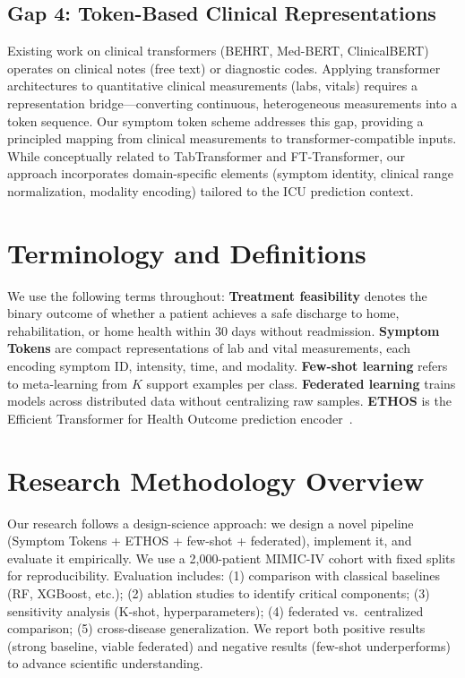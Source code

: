 \subsection{Gap 4: Token-Based Clinical Representations}

Existing work on clinical transformers (BEHRT, Med-BERT, ClinicalBERT) operates on clinical notes (free text) or diagnostic codes. Applying transformer architectures to quantitative clinical measurements (labs, vitals) requires a representation bridge---converting continuous, heterogeneous measurements into a token sequence. Our symptom token scheme addresses this gap, providing a principled mapping from clinical measurements to transformer-compatible inputs. While conceptually related to TabTransformer and FT-Transformer, our approach incorporates domain-specific elements (symptom identity, clinical range normalization, modality encoding) tailored to the ICU prediction context.

\section{Terminology and Definitions}

We use the following terms throughout: \textbf{Treatment feasibility} denotes the binary outcome of whether a patient achieves a safe discharge to home, rehabilitation, or home health within 30 days without readmission. \textbf{Symptom Tokens} are compact representations of lab and vital measurements, each encoding symptom ID, intensity, time, and modality. \textbf{Few-shot learning} refers to meta-learning from $K$ support examples per class. \textbf{Federated learning} trains models across distributed data without centralizing raw samples. \textbf{ETHOS} is the Efficient Transformer for Health Outcome prediction encoder~\cite{sharafi2023ethos}.

\section{Research Methodology Overview}

Our research follows a design-science approach: we design a novel pipeline (Symptom Tokens + ETHOS + few-shot + federated), implement it, and evaluate it empirically. We use a 2,000-patient MIMIC-IV cohort with fixed splits for reproducibility. Evaluation includes: (1) comparison with classical baselines (RF, XGBoost, etc.); (2) ablation studies to identify critical components; (3) sensitivity analysis (K-shot, hyperparameters); (4) federated vs.\ centralized comparison; (5) cross-disease generalization. We report both positive results (strong baseline, viable federated) and negative results (few-shot underperforms) to advance scientific understanding.

